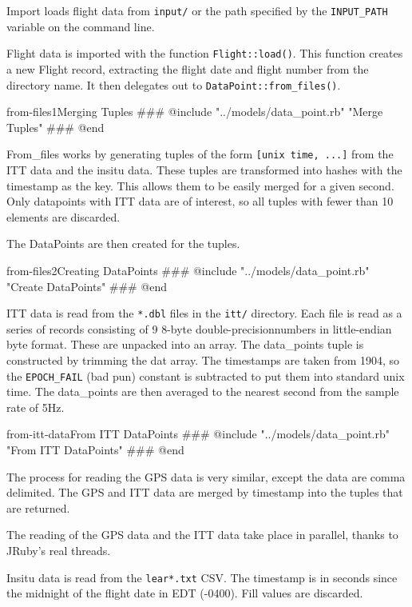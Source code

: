 \documentclass[12pt]{article}
\begin{document}
Import loads flight data from \texttt{input/} or the path specified by the \texttt{INPUT\_PATH} variable on the command line.  

Flight data is imported with the function \texttt{Flight::load()}. This function creates a new Flight record, extracting the flight date and flight number from the directory name.  It then delegates out to \texttt{DataPoint::from\_files()}.

\begin{code}{from-files1}{Merging Tuples}
### @include "../models/data_point.rb" "Merge Tuples"
### @end
\end{code}

From\_files works by generating tuples of the form \texttt{[unix time, ...]} from the ITT data and the insitu data. These tuples are transformed into hashes with the timestamp as the key.  This allows them to be easily merged for a given second.  Only datapoints with ITT data are of interest, so all tuples with fewer than 10 elements are discarded.

The DataPoints are then created for the tuples.

\begin{code}{from-files2}{Creating DataPoints}
### @include "../models/data_point.rb" "Create DataPoints"
### @end
\end{code}

ITT data is read from the \texttt{*.dbl} files in the \texttt{itt/} directory.  Each file is read as a series of records consisting of 9 8-byte double-precisionnumbers in little-endian byte format.  These are unpacked into an array.  The data\_points tuple is constructed by trimming the dat array.  The timestamps are taken from 1904, so the \texttt{EPOCH\_FAIL} (bad pun) constant is subtracted to put them into standard unix time.  The data\_points are then averaged to the nearest second from the sample rate of 5Hz.

\begin{code}{from-itt-data}{From ITT DataPoints}
### @include "../models/data_point.rb" "From ITT DataPoints"
### @end
\end{code}

The process for reading the GPS data is very similar, except the data are comma delimited.  The GPS and ITT data are merged by timestamp into the tuples that are returned.

The reading of the GPS data and the ITT data take place in parallel, thanks to JRuby's real threads.


Insitu data is read from the \texttt{lear*.txt} CSV.  The timestamp is in seconds since the midnight of the flight date in EDT (-0400).  Fill values are discarded.
\end{document}
